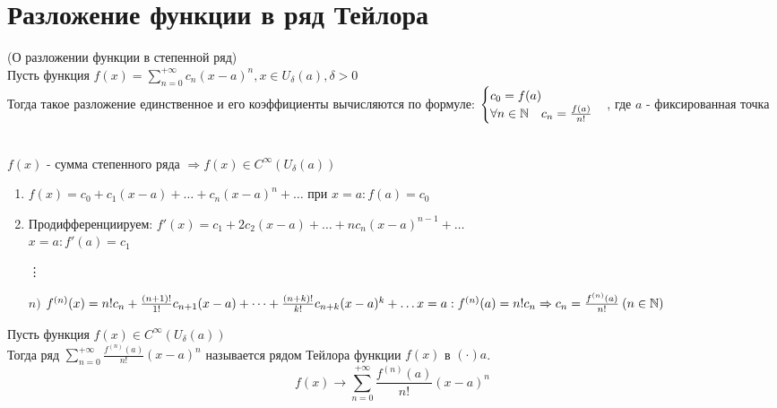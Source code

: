 \section{Разложение функции в ряд Тейлора}

\newcommand*\circled[1]{\tikz[baseline=(char.base)]{
		\node[shape=circle,draw,inner sep=2pt] (char) {#1};}}

\begin{Th}(О разложении функции в степенной ряд)\\
	Пусть функция $f(x) = \sum\limits_{n=0}^{+\infty}c_n(x-a)^n, x \in U_{\delta}(a), \delta > 0$\\
	Тогда такое разложение единственное и его коэффициенты вычисляются по формуле: 
	$\begin{cases}
	  c_0 = f(a)\\
	  \forall n \in \mathbb{N} \quad c_n =\frac{f(a)}{n!}
	\end{cases}$, где $a$ - фиксированная точка
\end{Th}

\begin{Proof}\\
	$f(x)$ - сумма степенного ряда $\Rightarrow f(x) \in C^{\infty}(U_{\delta}(a))$
	\begin{enumerate}[noitemsep]
		\item $f(x) = c_0 + c_1(x-a) + \dots + c_n(x-a)^n + \dots$ при $x=a: f(a) = c_0$
		\item Продифференциируем: $f'(x) = c_1 + 2c_2(x-a) + \dots + nc_n(x-a)^{n-1} + \dots$\\
			$x=a: f'(a) = c_1$
		\item[\vdots]
		\item[$n)$]$f^{(n)}(x) = n!c_n + \frac{(n+1)!}{1!}c_{n+1}(x-a) + \dots + \frac{(n+k)!}{k!}c_{n+k}(x-a)^k + \dots\\
			x = a: f^{(n)}(a) = n!c_n \Rightarrow c_n = \frac{f^{(n)}(a)}{n!} \: (n \in \mathbb{N})$
	\end{enumerate}
\end{Proof}

\begin{Def}
	Пусть функция $f(x) \in C^{\infty}(U_{\delta}(a))$\\
	Тогда ряд $\sum\limits_{n=0}^{+\infty}\frac{f^{(n)}(a)}{n!}(x-a)^n$ называется рядом Тейлора функции $f(x)$ в $(\cdot) a$. 
	$$f(x) \to \sum\limits_{n=0}^{+\infty}\frac{f^{(n)}(a)}{n!}(x-a)^n$$
\end{Def}

